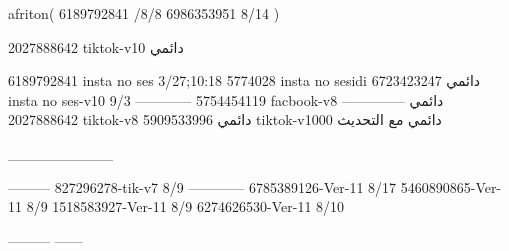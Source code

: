 afriton(
6189792841 /8/8
6986353951 8/14
)

2027888642 tiktok-v10
دائمي

6189792841 insta no ses
3/27;10:18
5774028 insta no sesidi
دائمي
6723423247 insta no ses-v10
9/3
------------
5754454119 facbook-v8
دائمي
--------------
2027888642 tiktok-v8
دائمي
5909533996 tiktok-v1000
دائمي مع التحديث

__________

---------
827296278-tik-v7
8/9
------------
6785389126-Ver-11
8/17
5460890865-Ver-11
8/9
1518583927-Ver-11
8/9
6274626530-Ver-11
8/10

---------
------
